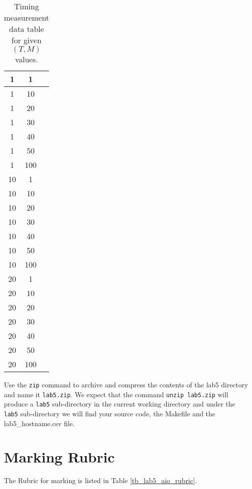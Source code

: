 \begin{enumerate}
\begin{table}[h]
\begin{center}
\begin{tabular}{|c|c|c|}
1 &    1 &    \\ \hline
1 &    10 &    \\ \hline
1 &    20 &    \\ \hline
1 &    30 &    \\ \hline
1 &    40 &    \\ \hline
1 &    50 &    \\ \hline
1 &    100 &    \\ \hline
10 &    1 &    \\ \hline
10 &    10 &    \\ \hline
10 &    20 &    \\ \hline
10 &    30 &    \\ \hline
10 &    40 &    \\ \hline
10 &    50 &    \\ \hline
10 &    100 &    \\ \hline
20 &    1 &    \\ \hline
20 &    10 &    \\ \hline
20 &    20 &    \\ \hline
20 &    30 &    \\ \hline
20 &    40 &    \\ \hline
20 &    50 &    \\ \hline
20 &    100 &    \\ \hline

\end{tabular}
\caption{Timing measurement data table for given $(T, M)$ values.}
\label{tb_timing_lab5}
\end{center}
\end{table}
\end{enumerate}
Use the \verb+zip+ command to archive and compress the contents of the lab5 directory and name it \verb+lab5.zip+. We expect that the command \verb+unzip lab5.zip+ will produce a \verb+lab5+ sub-directory in the current working directory and under the \verb+lab5+ sub-directory we will find your source code, the Makefile and the lab5\_hostname.csv file.

\section{Marking Rubric}
The Rubric for marking is listed in Table \ref{tb_lab5_aio_rubric}.


